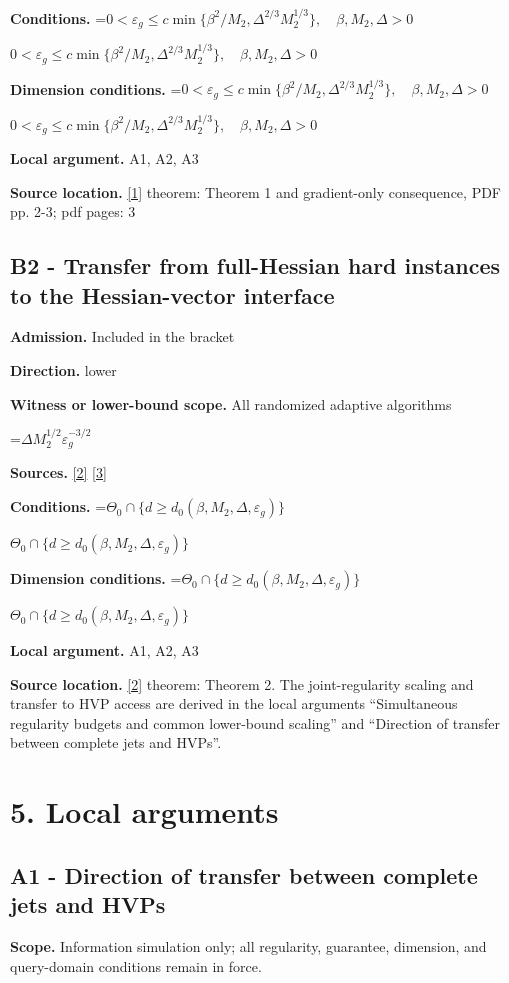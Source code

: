 \documentclass[10pt,a4paper]{article}
\newcommand{\AtlasMath}[1]{\par\begingroup\centering\setbox0=\hbox{$\displaystyle #1$}\ifdim\wd0>1.4\linewidth\typeout{ATLAS WIDE FORMULA: \the\wd0}\fi\ifdim\wd0>\linewidth\resizebox{\linewidth}{!}{\box0}\else\box0\fi\par\endgroup}
\newcommand{\AtlasInlineMath}[1]{\begingroup\setbox0=\hbox{$#1$}\ifdim\wd0>.4\linewidth\endgroup\AtlasMath{#1}\else\endgroup$#1$\fi}
\begin{document}
\textbf{Conditions.} \AtlasInlineMath{0<\varepsilon_g\le c\min\{\beta^2/M_2,\Delta^{2/3}M_2^{1/3}\},\quad\beta,M_2,\Delta>0}

\textbf{Dimension conditions.} \AtlasInlineMath{0<\varepsilon_g\le c\min\{\beta^2/M_2,\Delta^{2/3}M_2^{1/3}\},\quad\beta,M_2,\Delta>0}

\textbf{Local argument.} A1, A2, A3

\textbf{Source location.} \href{https://proceedings.nips.cc/paper_files/paper/2025/file/3dc910c921507a5d51d3dac0202b2618-Paper-Conference.pdf}{[1]} theorem: Theorem 1 and gradient-only consequence, PDF pp. 2-3; pdf pages: 3

\subsection{B2 - Transfer from full-Hessian hard instances to the Hessian-vector interface}
\textbf{Admission.} Included in the bracket

\textbf{Direction.} lower

\textbf{Witness or lower-bound scope.} All randomized adaptive algorithms

\AtlasMath{\Delta M_2^{1/2}\varepsilon_g^{-3/2}}
\textbf{Sources.} \href{https://arxiv.org/abs/1710.11606v3}{[2]} \href{https://optimization-online.org/wp-content/uploads/2015/06/4970.pdf}{[3]}

\textbf{Conditions.} \AtlasInlineMath{\Theta_0\cap\{d\ge d_0(\beta,M_2,\Delta,\varepsilon_g)\}}

\textbf{Dimension conditions.} \AtlasInlineMath{\Theta_0\cap\{d\ge d_0(\beta,M_2,\Delta,\varepsilon_g)\}}

\textbf{Local argument.} A1, A2, A3

\textbf{Source location.} \href{https://arxiv.org/abs/1710.11606v3}{[2]} theorem: Theorem 2. The joint-regularity scaling and transfer to HVP access are derived in the local arguments “Simultaneous regularity budgets and common lower-bound scaling” and “Direction of transfer between complete jets and HVPs”.

\section{5. Local arguments}
\subsection{A1 - Direction of transfer between complete jets and HVPs}
\textbf{Scope.} Information simulation only; all regularity, guarantee, dimension, and query-domain conditions remain in force.
\end{document}
